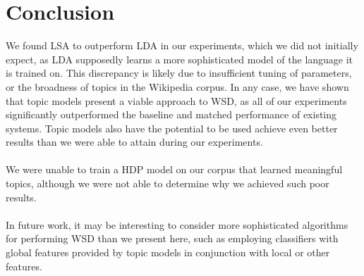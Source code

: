 
\section{Conclusion}

We found LSA to outperform LDA in our experiments, which we did not initially expect, as LDA supposedly learns a more sophisticated model of the language it is trained on. This discrepancy is likely due to insufficient tuning of parameters, or the broadness of topics in the Wikipedia corpus. In any case, we have shown that topic models present a viable approach to WSD, as all of our experiments significantly outperformed the baseline and matched performance of existing systems. Topic models also have the potential to be used achieve even better results than we were able to attain during our experiments.\\\\
We were unable to train a HDP model on our corpus that learned meaningful topics, although we were not able to determine why we achieved such poor results. \\\\
In future work, it may be interesting to consider more sophisticated algorithms for performing WSD than we present here, such as employing classifiers with global features provided by topic models in conjunction with local or other features. 